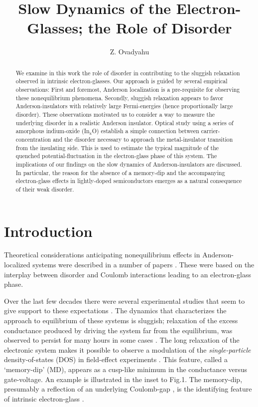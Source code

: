 \documentclass
[preprint,showpacs,byrevtex,10pt,twocolumn,tightenlines,prl,letterpaper]{revtex4}%
\begin{document}
\preprint{ }
\title{Slow Dynamics of the Electron-Glasses; the Role of Disorder}
\author{Z. Ovadyahu}


\begin{abstract}
We examine in this work the role of disorder in contributing to the sluggish
relaxation observed in intrinsic electron-glasses. Our approach is guided by
several empirical observations: First and foremost, Anderson localization is a
pre-requisite for observing these nonequilibrium phenomena. Secondly, sluggish
relaxation appears to favor Anderson-insulators with relatively large
Fermi-energies (hence proportionally large disorder). These observations
motivated us to consider a way to measure the underlying disorder in a
realistic Anderson insulator. Optical study using a series of amorphous
indium-oxide (In$_{\text{x}}$O) establish a simple connection between
carrier-concentration and the disorder necessary to approach the
metal-insulator transition from the insulating side. This is used to estimate
the typical magnitude of the quenched potential-fluctuation in the
electron-glass phase of this system. The implications of our findings on the
slow dynamics of Anderson-insulators are discussed. In particular, the reason
for the absence of a memory-dip and the accompanying electron-glass effects in
lightly-doped semiconductors emerges as a natural consequence of their weak disorder.

\end{abstract}
\maketitle


\section{Introduction}

Theoretical considerations anticipating nonequilibrium effects in
Anderson-localized systems were described in a number of papers
\cite{1,2,3,4,5,6,7,8,9,10,11,12}. These were based on the interplay between
disorder and Coulomb interactions leading to an electron-glass phase.

Over the last few decades there were several experimental studies that seem to
give support to these expectations \cite{13,14,15}. The dynamics that
characterizes the approach to equilibrium of these systems is sluggish;
relaxation of the excess conductance produced by driving the system far from
the equilibrium, was observed to persist for many hours in some cases
\cite{16}. The long relaxation of the electronic system makes it possible to
observe a modulation of the \textit{single-particle} density-of-states (DOS)
in field-effect experiments \cite{17}. This feature, called a `memory-dip'
(MD), appears as a cusp-like minimum in the conductance versus gate-voltage.
An example is illustrated in the inset to Fig.1. The memory-dip, presumably
\cite{5,9} a reflection of an underlying Coulomb-gap \cite{20,21}, is the
identifying feature of intrinsic electron-glass \cite{5,6,9,11,22}.
\end{document}
